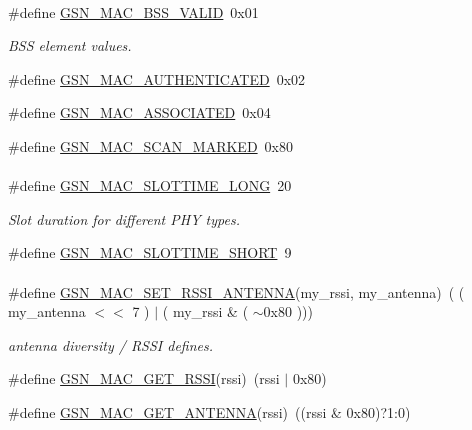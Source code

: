 \paragraph*{}
\begin{DoxyCompactItemize}
\item 
\#define \hyperlink{a00642_ga98d81e9fac7e3e57bb933a0e8774312b}{GSN\_\-MAC\_\-BSS\_\-VALID}~0x01
\begin{DoxyCompactList}\small\item\em BSS element values. \end{DoxyCompactList}\item 
\#define \hyperlink{a00642_ga11cf8c8f47218aaccfe9b0342ad34b1a}{GSN\_\-MAC\_\-AUTHENTICATED}~0x02
\item 
\#define \hyperlink{a00642_gac95d79b5108d9696c78d41bf0bfc5f62}{GSN\_\-MAC\_\-ASSOCIATED}~0x04
\item 
\#define \hyperlink{a00642_gaa8c55e757f0ecc6201c7a9db8808da39}{GSN\_\-MAC\_\-SCAN\_\-MARKED}~0x80
\end{DoxyCompactItemize}

\paragraph*{}
\begin{DoxyCompactItemize}
\item 
\#define \hyperlink{a00642_gaf9a051751a39d7ec6cf8e671deafd3ff}{GSN\_\-MAC\_\-SLOTTIME\_\-LONG}~20
\begin{DoxyCompactList}\small\item\em Slot duration for different PHY types. \end{DoxyCompactList}\item 
\#define \hyperlink{a00642_ga081f6423e4f0a7752d2a289c9a7eedbc}{GSN\_\-MAC\_\-SLOTTIME\_\-SHORT}~9
\end{DoxyCompactItemize}

\paragraph*{}
\begin{DoxyCompactItemize}
\item 
\#define \hyperlink{a00642_gae099692a4b641e183742ae960e3d2cb9}{GSN\_\-MAC\_\-SET\_\-RSSI\_\-ANTENNA}(my\_\-rssi, my\_\-antenna)~( ( my\_\-antenna $<$$<$ 7 ) $|$ ( my\_\-rssi \& ( $\sim$0x80 )))
\begin{DoxyCompactList}\small\item\em antenna diversity / RSSI defines. \end{DoxyCompactList}\item 
\#define \hyperlink{a00642_ga0baa7c82496dc0f07898a5df0d135d5c}{GSN\_\-MAC\_\-GET\_\-RSSI}(rssi)~(rssi $|$ 0x80)
\item 
\#define \hyperlink{a00642_gaf90baba19031f5fc0662b2e19649b7cd}{GSN\_\-MAC\_\-GET\_\-ANTENNA}(rssi)~((rssi \& 0x80)?1:0)
\end{DoxyCompactItemize}


